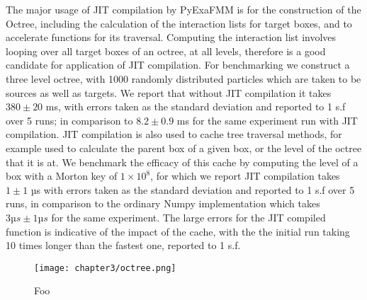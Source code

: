 The major usage of \gls{JIT} compilation by \gls{PyExaFMM} is for the construction
of the Octree, including the calculation of the interaction lists for target
boxes, and to accelerate functions for its traversal. Computing the interaction list
involves looping over all target boxes of an octree, at all levels, therefore
is a good candidate for application of \gls{JIT} compilation. For benchmarking
we construct a three level octree, with 1000 randomly distributed particles which are
taken to be sources as well as targets. We report that without \gls{JIT} compilation
it takes $380 \pm 20$ ms, with errors taken as the standard deviation
and reported to 1 s.f over 5 runs; in comparison
to $8.2 \pm 0.9$ ms for the same experiment run with \gls{JIT} compilation.
\gls{JIT} compilation is also used to cache tree traversal methods, for example
used to calculate the parent box of a given box, or the level of the octree that
it is at. We benchmark the efficacy of this cache by computing the level
of a box with a Morton key of $1 \times 10^8$, for which we report \gls{JIT} compilation
takes $1 \pm 1$ µs with errors taken as the standard deviation and reported
to 1 s.f over 5 runs, in comparison to the ordinary Numpy implementation which takes
$3 µs ± 1 µs$ for the same experiment. The large errors for the \gls{JIT} compiled
function is indicative of the impact of the cache, with the the initial
run taking 10 times longer than the fastest one, reported to 1 s.f.

\begin{figure}[ht]
    \centering

  {\texttt{[image: chapter3/octree.png]}}
  \vspace{0pt}
    \caption{
        Foo
    }
    \label{fig:3_1_octree}
\end{figure}


